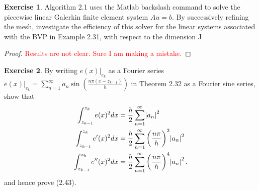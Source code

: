 \documentclass{amsart}
\theoremstyle{plain}
\theoremstyle{definition}
\newtheorem{exer}{Exercise}[section]
\newcommand{\tcr}[1]{\textcolor{red}{#1}}
\begin{document}
\begin{exer}
    Algorithm 2.1 uses the Matlab backslash command to solve the piecewise linear Galerkin finite element system $Au = b$. By successively refining the mesh, investigate the efficiency of this solver for the linear systems associated with the BVP in Example 2.31, with respect to the dimension J
\end{exer}
\begin{proof}
    \tcr{Results are not clear. Sure I am making a mistake.}
\end{proof}
\begin{exer}
    By writing $e(x)\vert_{e_k}$ as a Fourier series $e(x)\vert_{e_k} = \sum_{n=1}^\infty a_n \sin\left(\frac{n\pi (x-z_{k-1})}{h}\right)$ in Theorem 2.32 as a Fourier sine series, show that 
    \begin{align*}
        \int_{z_{k-1}}^{z_k} e(x)^2 dx & = \frac{h}{2}\sum_{n=1}^\infty \abs{a_n}^2 \\
         \int_{z_{k-1}}^{z_k} e'(x)^2 dx & = \frac{h}{2}\sum_{n=1}^\infty \left(\frac{n\pi}{h}\right)^2\abs{a_n}^2 \\
          \int_{z_{k-1}}^{z_k} e''(x)^2 dx & = \frac{h}{2}\sum_{n=1}^\infty \left(\frac{n\pi}{h}\right)^4\abs{a_n}^2.
    \end{align*}
    and hence prove (2.43).
\end{exer}
\end{document}

